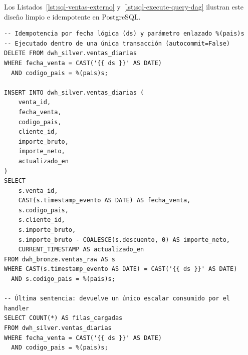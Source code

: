 Los Listados~\ref{lst:sql-ventas-externo} y~\ref{lst:sql-execute-query-dag} ilustran este diseño limpio e idempotente en PostgreSQL.

\begin{lstlisting}[style=sql, caption={Archivo externo \texttt{include/sql/cargar\_ventas\_diarias.sql} con carga idempotente por partición y parámetro seguro.}, label={lst:sql-ventas-externo}]
-- Idempotencia por fecha lógica (ds) y parámetro enlazado %(pais)s
-- Ejecutado dentro de una única transacción (autocommit=False)
DELETE FROM dwh_silver.ventas_diarias
WHERE fecha_venta = CAST('{{ ds }}' AS DATE)
  AND codigo_pais = %(pais)s;

INSERT INTO dwh_silver.ventas_diarias (
    venta_id,
    fecha_venta,
    codigo_pais,
    cliente_id,
    importe_bruto,
    importe_neto,
    actualizado_en
)
SELECT
    s.venta_id,
    CAST(s.timestamp_evento AS DATE) AS fecha_venta,
    s.codigo_pais,
    s.cliente_id,
    s.importe_bruto,
    s.importe_bruto - COALESCE(s.descuento, 0) AS importe_neto,
    CURRENT_TIMESTAMP AS actualizado_en
FROM dwh_bronze.ventas_raw AS s
WHERE CAST(s.timestamp_evento AS DATE) = CAST('{{ ds }}' AS DATE)
  AND s.codigo_pais = %(pais)s;

-- Última sentencia: devuelve un único escalar consumido por el handler
SELECT COUNT(*) AS filas_cargadas
FROM dwh_silver.ventas_diarias
WHERE fecha_venta = CAST('{{ ds }}' AS DATE)
  AND codigo_pais = %(pais)s;
\end{lstlisting}

